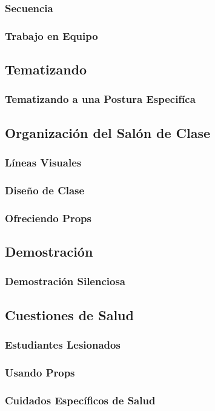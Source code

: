 \documentclass[a4paper]{article}
\begin{document}
\subsubsection{Secuencia}
\subsubsection{Trabajo en Equipo}
\subsection{Tematizando}
\subsubsection{Tematizando a una Postura Especifíca}
\subsection{Organización del Salón de Clase}
\subsubsection{Líneas Visuales}
\subsubsection{Diseño de Clase}
\subsubsection{Ofreciendo Props}
\subsection{Demostración}
\subsubsection{Demostración Silenciosa}
\subsection{Cuestiones de Salud}
\subsubsection{Estudiantes Lesionados}
\subsubsection{Usando Props}
\subsubsection{Cuidados Específicos de Salud}
\end{document}
